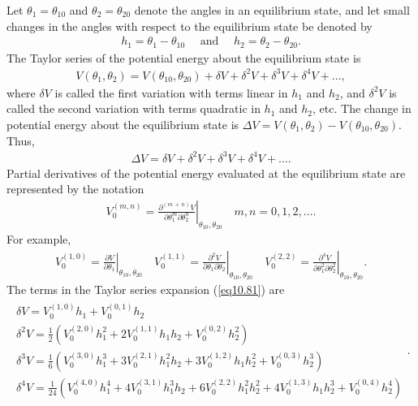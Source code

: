 \documentclass{AeroStructure-ERJohnson}
\begin{document}
\vspace*{-1pc}

Let $\theta_{1}=\theta_{10}$ and $\theta_{2}=\theta_{20}$ denote the angles in an equilibrium state, and let small changes in the angles with respect to the equilibrium state be denoted by
\begin{align}\label{eq10.79}
h_{1}=\theta_{1}-\theta_{10} \quad \text { and } \quad h_{2}=\theta_{2}-\theta_{20}.
\end{align}
The Taylor series of the potential energy about the equilibrium state is
\begin{align}\label{eq10.80}
V\left(\theta_{1}, \theta_{2}\right)=V\left(\theta_{10}, \theta_{20}\right)+\delta V+\delta^{2} V+\delta^{3} V+\delta^{4} V+\ldots,
\end{align}
where $\delta V$ is called the first variation with terms linear in $h_1$ and $h_2$, and $\delta^{2} V$ is called the second variation with terms quadratic in $h_1$ and $h_2$, etc. The change in potential energy about the equilibrium state is $\Delta V=V\left(\theta_{1}, \theta_{2}\right)-V\left(\theta_{10}, \theta_{20}\right)$. Thus,
\begin{align}\label{eq10.81}
\Delta V=\delta V+\delta^{2} V+\delta^{3} V+\delta^{4} V+\ldots.
\end{align}
Partial derivatives of the potential energy evaluated at the equilibrium state are represented by the notation
\begin{align}\label{eq10.82}
V_{0}^{(m, n)}=\left.\frac{\partial^{(m\,{+}\,n)} V}{\partial \theta_{1}^{m} \partial \theta_{2}^{n}}\right|_{\theta_{10}, \theta_{20}} \quad m, n=0,1,2, \ldots.
\end{align}
For example,
\begin{align}\label{eq10.83}
V_{0}^{(1,0)}=\left.\frac{\partial V}{\partial \theta_{1}}\right|_{\theta_{10}, \theta_{20}} \quad V_{0}^{(1,1)}=\left.\frac{\partial^{2} V}{\partial \theta_{1} \partial \theta_{2}}\right|_{\theta_{10}, \theta_{20}} \quad V_{0}^{(2,2)}=\left.\frac{\partial^{4} V}{\partial \theta_{1}^{2} \partial \theta_{2}^{2}}\right|_{\theta_{10}, \theta_{20}}.
\end{align}
The terms in the Taylor series expansion (\ref{eq10.81}) are
\begin{align}\label{eq10.84}
\begin{gathered}
\delta V=V_{0}^{(1,0)} h_{1}+V_{0}^{(0,1)} h_{2} \\
\delta^{2} V=\frac{1}{2}\left(V_{0}^{(2,0)} h_{1}^{2}+2 V_{0}^{(1,1)} h_{1} h_{2}+V_{0}^{(0,2)} h_{2}^{2}\right) \\
\delta^{3} V=\frac{1}{6}\left(V_{0}^{(3,0)} h_{1}^{3}+3 V_{0}^{(2,1)} h_{1}^{2} h_{2}+3 V_0^{(1,2)} h_{1} h_{2}^{2}+V_{0}^{(0,3)} h_{2}^{3}\right) \\
\delta^{4} V=\frac{1}{24}\left(V_{0}^{(4,0)} h_{1}^{4}+4 V_{0}^{(3,1)} h_{1}^{3} h_{2}+6 V_{0}^{(2,2)} h_{1}^{2} h_{2}^{2}+4 V_{0}^{(1,3)} h_{1} h_{2}^{3}+V_{0}^{(0,4)} h_{2}^{4}\right)
\end{gathered}.
\end{align}
\end{document}
